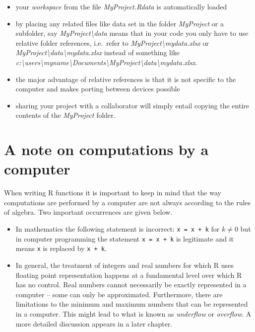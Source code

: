 \documentclass[
]{book}
\begin{document}
\begin{itemize}
\item
  your \emph{{workspace}} from the file \emph{{MyProject.Rdata}} is automatically loaded
\item
  by placing any related files like data set in the folder \emph{{MyProject}} or a subfolder, say \emph{{MyProject\textbackslash data}} means that in your code you only have to use relative folder references, i.e.~refer to \emph{{MyProject\textbackslash mydata.xlsx}} or \emph{{MyProject\textbackslash data\textbackslash mydata.xlsx}} instead of something like \emph{{c:\textbackslash users\textbackslash myname\textbackslash Documents\textbackslash MyProject\textbackslash data\textbackslash mydata.xlsx}}.
\item
  the major advantage of relative references is that it is not specific to the computer and makes porting between devices possible
\item
  sharing your project with a collaborator will simply entail copying the entire contents of the \emph{{MyProject}} folder.
\end{itemize}

\section{A note on computations by a computer}\label{a-note-on-computations-by-a-computer}

When writing R functions it is important to keep in mind that the way computations are performed by a computer are not always according to the rules of algebra. Two important occurrences are given below.

\begin{itemize}
\item
  In mathematics the following statement is incorrect: \texttt{x\ =\ x\ +\ k} for \(k \neq 0\) but in computer programming the statement \texttt{x\ =\ x\ +\ k} is legitimate and it means \texttt{x} is replaced by \texttt{x\ +\ k}.
\item
  In general, the treatment of integers and real numbers for which R uses floating point representation happens at a fundamental level over which R has no control. Real numbers cannot necessarily be exactly represented in a computer -- some can only be approximated. Furthermore, there are limitations to the minimum and maximum numbers that can be represented in a computer. This might lead to what is known as \emph{{underflow}} or \emph{{overflow}}. A more detailed discussion appears in a later chapter.
\end{itemize}
\end{document}
